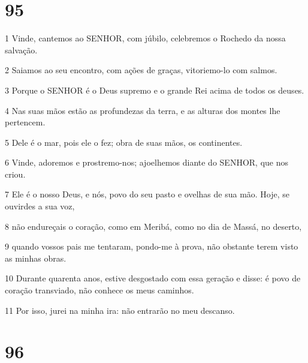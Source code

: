 \chapter{95}

\par 1 Vinde, cantemos ao SENHOR, com júbilo, celebremos o Rochedo da nossa salvação.
\par 2 Saiamos ao seu encontro, com ações de graças, vitoriemo-lo com salmos.
\par 3 Porque o SENHOR é o Deus supremo e o grande Rei acima de todos os deuses.
\par 4 Nas suas mãos estão as profundezas da terra, e as alturas dos montes lhe pertencem.
\par 5 Dele é o mar, pois ele o fez; obra de suas mãos, os continentes.
\par 6 Vinde, adoremos e prostremo-nos; ajoelhemos diante do SENHOR, que nos criou.
\par 7 Ele é o nosso Deus, e nós, povo do seu pasto e ovelhas de sua mão. Hoje, se ouvirdes a sua voz,
\par 8 não endureçais o coração, como em Meribá, como no dia de Massá, no deserto,
\par 9 quando vossos pais me tentaram, pondo-me à prova, não obstante terem visto as minhas obras.
\par 10 Durante quarenta anos, estive desgostado com essa geração e disse: é povo de coração transviado, não conhece os meus caminhos.
\par 11 Por isso, jurei na minha ira: não entrarão no meu descanso.

\chapter{96}

